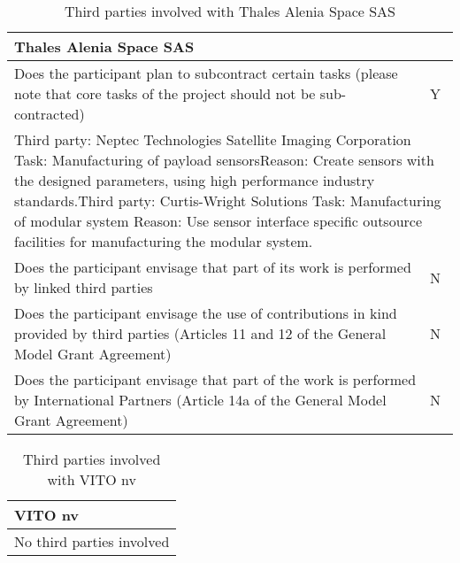 \begin{table}[H]
	\centering
	\begin{tabular}{|p{10cm}|p{4cm}|}
		\hline
		
		\multicolumn{2}{|p{14cm}|}{\textbf{Thales Alenia Space SAS}}\\
		
		\hline
		
		Does the participant plan to subcontract certain tasks (please note that core tasks of the project should not be sub-contracted) & Y\\
		
		\hline
		
		\multicolumn{2}{|p{14cm}|}{Third party: Neptec Technologies Satellite Imaging Corporation \newline Task: Manufacturing of payload sensors\newline Reason: Create sensors with the designed parameters, using high performance industry standards.\vspace{0.2cm}\newline Third party: Curtis-Wright Solutions \newline Task: Manufacturing of modular system \newline Reason: Use sensor interface specific outsource facilities for manufacturing the modular system.}\\
		
		\hline
		
		Does the participant envisage that part of its work is performed by linked third parties & N\\
		
		\hline
		
		Does the participant envisage the use of contributions in kind provided by third parties (Articles 11 and 12 of the General Model Grant Agreement) & N\\
		
		\hline
		
		Does the participant envisage that part of the work is performed by International Partners (Article 14a of the General Model Grant Agreement) & N\\
		
		\hline
		
	\end{tabular}
	\caption{Third parties involved with Thales Alenia Space SAS}
\end{table}



\begin{table}[H]
	\centering
	\begin{tabular}{|p{10cm}|p{4cm}|}
		\hline
		
		\multicolumn{2}{|p{14cm}|}{\textbf{VITO nv}}\\
		
		\hline
		
		\multicolumn{2}{|p{14cm}|}{No third parties involved}\\
		
		\hline
	\end{tabular}
	\caption{Third parties involved with VITO nv}
\end{table}